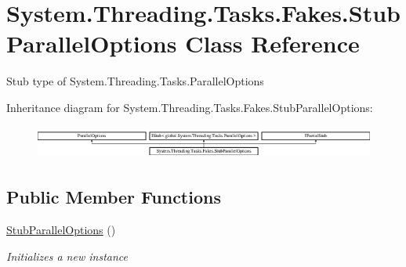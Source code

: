 \hypertarget{class_system_1_1_threading_1_1_tasks_1_1_fakes_1_1_stub_parallel_options}{\section{System.\-Threading.\-Tasks.\-Fakes.\-Stub\-Parallel\-Options Class Reference}
\label{class_system_1_1_threading_1_1_tasks_1_1_fakes_1_1_stub_parallel_options}
}


Stub type of System.\-Threading.\-Tasks.\-Parallel\-Options 


Inheritance diagram for System.\-Threading.\-Tasks.\-Fakes.\-Stub\-Parallel\-Options\-:\begin{figure}[H]
\begin{center}
\leavevmode
\includegraphics[height=1.107814cm]{class_system_1_1_threading_1_1_tasks_1_1_fakes_1_1_stub_parallel_options}
\end{center}
\end{figure}
\subsection*{Public Member Functions}
\begin{DoxyCompactItemize}
\item 
\hyperlink{class_system_1_1_threading_1_1_tasks_1_1_fakes_1_1_stub_parallel_options_a5029195d0ab4499f24518f0d85ae6cee}{Stub\-Parallel\-Options} ()
\begin{DoxyCompactList}\small\item\em Initializes a new instance\end{DoxyCompactList}\end{DoxyCompactItemize}
